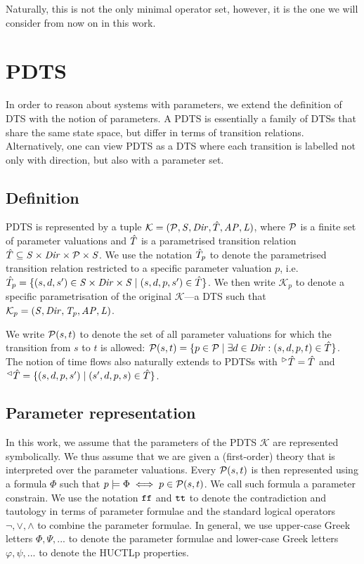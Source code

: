 Naturally, this is not the only minimal operator set, however, it is the one we will consider from now on in this work.

\section{\Acl{PDTS}}

In order to reason about systems with parameters, we extend the definition of \ac{DTS} with the notion of parameters. A \ac{PDTS} is essentially a family of \acp{DTS} that share the same state space, but differ in terms of transition relations. Alternatively, one can view \ac{PDTS} as a \ac{DTS} where each transition is labelled not only with direction, but also with a parameter set.

\subsection{Definition}

\Acl{PDTS} is represented by a tuple $\mathcal{K} = (\mathcal{P}, \mathit{S}, \mathit{Dir}, \hat{T}, \mathit{AP}, \mathit{L})$, where $\mathcal{P}$ is a finite set of parameter valuations and $\hat{T}$ is a parametrised transition relation $\hat{T} \subseteq \mathit{S} \times \mathit{Dir} \times \mathcal{P} \times \mathit{S}$. We use the notation $\hat{T}_p$ to denote the parametrised transition relation restricted to a specific parameter valuation $p$, i.e. $\hat{T}_p = \{ (s, d, s') \in \mathit{S} \times \mathit{Dir} \times \mathit{S} \mid (s, d, p, s') \in \hat{T} \}$.  We then write $\mathcal{K}_p$ to denote a specific parametrisation of the original $\mathcal{K}$—a \ac{DTS} such that $\mathcal{K}_p = (\mathit{S}, \mathit{Dir}, \mathit{T}_p, \mathit{AP}, \mathit{L})$. 

We	 write $\mathcal{P}(s, t)$ to denote the set of all parameter valuations for which the transition from $s$ to $t$ is allowed: $\mathcal{P}(s, t) = \{ p \in \mathcal{P} \mid \exists d \in \mathit{Dir} : (s, d, p, t) \in \hat{T} \}$. The notion of time flows also naturally extends to \acp{PDTS} with ${}^\vartriangleright\hat{T} = \hat{T}$ and ${}^\vartriangleleft\hat{T} = \{ (s, d, p, s') \mid (s', d, p, s) \in \hat{T} \}$.

\subsection{Parameter representation}
\label{sec:paramRepresentation}

In this work, we assume that the parameters of the \ac{PDTS} $\mathcal{K}$ are represented symbolically. We thus assume that we are given a (first-order) theory that is interpreted over the parameter valuations. Every $\mathcal{P}(s, t)$ is then represented using a formula $\Phi$ such that $p \models \Phi \iff p \in \mathcal{P}(s, t)$. We call such formula a parameter constrain. We use the notation $\texttt{ff}$ and $\texttt{tt}$ to denote the contradiction and tautology in terms of parameter formulae and the standard logical operators $\neg, \lor, \land$ to combine the parameter formulae. In general, we use upper-case Greek letters $\Phi, \Psi, ...$ to denote the parameter formulae and lower-case Greek letters $\varphi, \psi, ...$ to denote the \ac{HUCTLp} properties.

